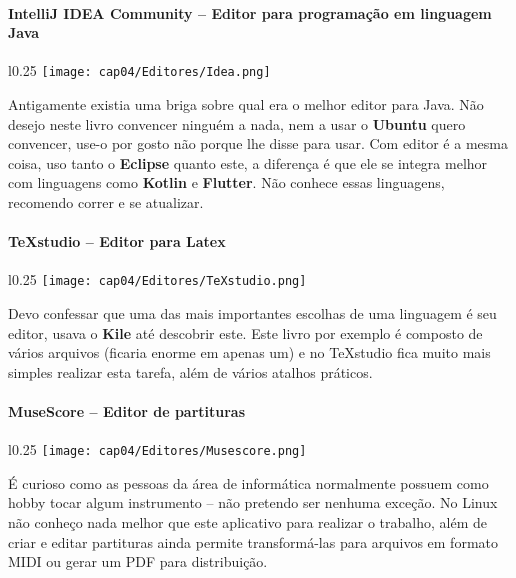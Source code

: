 \paragraph{IntelliJ IDEA Community – Editor para programação em linguagem Java}
\begin{minipage}{\linewidth}
 \vspace{5pt}
 \begin{wrapfigure}{l}{0.25\textwidth}
  \vspace{-\baselineskip}
  \texttt{[image: cap04/Editores/Idea.png]} 
 \end{wrapfigure}
 Antigamente existia uma briga sobre qual era o melhor editor para Java. Não desejo neste livro convencer ninguém a nada, nem a usar o \textbf{Ubuntu} quero convencer, use-o por gosto não porque lhe disse para usar. Com editor é a mesma coisa, uso tanto o \textbf{Eclipse} quanto este, a diferença é que ele se integra melhor com linguagens como \textbf{Kotlin} e \textbf{Flutter}. Não conhece essas linguagens, recomendo correr e se atualizar.
\end{minipage}

\paragraph{TeXstudio – Editor para Latex}
\begin{minipage}{\linewidth}
 \vspace{5pt}
 \begin{wrapfigure}{l}{0.25\textwidth}
  \vspace{-\baselineskip}
  \texttt{[image: cap04/Editores/TeXstudio.png]} 
 \end{wrapfigure}
 Devo confessar que uma das mais importantes escolhas de uma linguagem é seu editor, usava o \textbf{Kile} até descobrir este. Este livro por exemplo é composto de vários arquivos (ficaria enorme em apenas um) e no TeXstudio fica muito mais simples realizar esta tarefa, além de vários atalhos práticos.
\end{minipage}

\paragraph{MuseScore – Editor de partituras}
\begin{minipage}{\linewidth}
 \vspace{5pt}
 \begin{wrapfigure}{l}{0.25\textwidth}
  \vspace{-\baselineskip}
  \texttt{[image: cap04/Editores/Musescore.png]} 
 \end{wrapfigure}
 É curioso como as pessoas da área de informática normalmente possuem como hobby tocar algum instrumento – não pretendo ser nenhuma exceção. No Linux não conheço nada melhor que este aplicativo para realizar o trabalho, além de criar e editar partituras ainda permite transformá-las para arquivos em formato MIDI ou gerar um PDF para distribuição.
\end{minipage}

